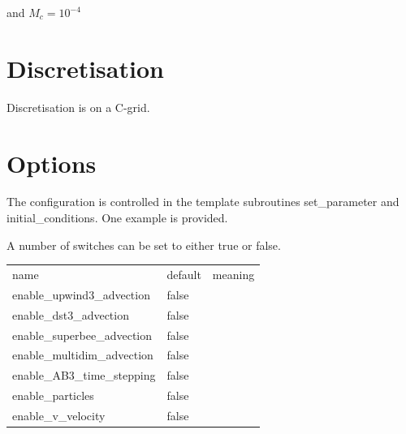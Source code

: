 \documentclass[12pt]{article}
\begin{document}
and $M_c = 10^{-4}$ 

\section*{Discretisation}


Discretisation is on a C-grid.

\section*{Options}

The configuration is controlled in the template subroutines {\sc set\_parameter}
and {\sc initial\_conditions}. One example is provided. 

A number of switches can be set to either true or false.

\begin{tabular}{l  l  l }
 name & default & meaning \\
enable\_upwind3\_advection  & false & \\
   enable\_dst3\_advection     & false \\
 enable\_superbee\_advection & false\\
 enable\_multidim\_advection & false \\
 enable\_AB3\_time\_stepping  & false \\
enable\_particles          & false \\
 enable\_v\_velocity         & false \\
\end{tabular}
\end{document}
